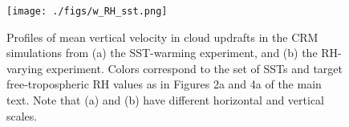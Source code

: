 \documentclass[draft,grl]{agutexSI}
\begin{document}
\begin{article}



%

%
%
\end{article}
\clearpage


%
 
\begin{figure}
\begin{center}
\texttt{[image: ./figs/w\_RH\_sst.png]}
\caption{Profiles of mean vertical velocity in cloud updrafts in the CRM simulations from (a) the SST-warming experiment, and (b) the RH-varying experiment. Colors correspond to the set of SSTs and target free-tropospheric RH values as in Figures 2a and 4a of the main text. Note that (a) and (b) have different horizontal and vertical scales.} 
\label{fig:w_RH}
\end{center}
\end{figure}
\end{document}
